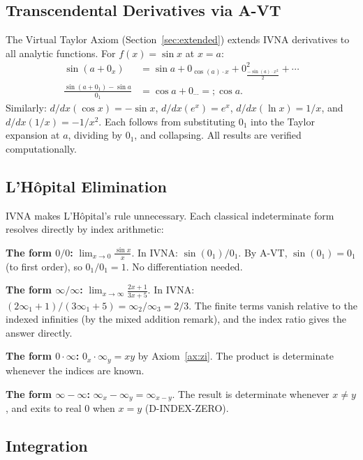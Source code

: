 \documentclass[12pt]{article}
\theoremstyle{definition}
\theoremstyle{remark}
\newcommand{\vz}[1]{0_{#1}}             %
\newcommand{\vi}[1]{\infty_{#1}}        %
\newcommand{\vzn}[2]{0^{#1}_{#2}}       %
\newcommand{\ceq}{\mathrel{=\!\!;}}     %
\begin{document}
\subsection{Transcendental Derivatives via A-VT}

The Virtual Taylor Axiom (Section~\ref{sec:extended}) extends IVNA
derivatives to all analytic functions. For $f(x) = \sin x$ at $x = a$:
\begin{align*}
\sin(a + \vz{x}) &= \sin a + \vz{\cos(a) \cdot x}
  + \vzn{2}{\tfrac{-\sin(a) \cdot x^2}{2}} + \cdots \\
\frac{\sin(a + \vz{1}) - \sin a}{\vz{1}} &= \cos a + \vz{\cdots}
  \ceq \cos a.
\end{align*}
Similarly: $d/dx(\cos x) = -\sin x$, $d/dx(e^x) = e^x$,
$d/dx(\ln x) = 1/x$, and $d/dx(1/x) = -1/x^2$. Each follows from
substituting $\vz{1}$ into the Taylor expansion at $a$, dividing by
$\vz{1}$, and collapsing. All results are verified computationally.

\subsection{L'H\^opital Elimination}

IVNA makes L'H\^opital's rule unnecessary. Each classical
indeterminate form resolves directly by index arithmetic:

\medskip
\noindent\textbf{The form $0/0$:}
$\displaystyle\lim_{x \to 0} \frac{\sin x}{x}$.
In IVNA: $\sin(\vz{1})/\vz{1}$. By A-VT, $\sin(\vz{1}) = \vz{1}$
(to first order), so $\vz{1}/\vz{1} = 1$. No differentiation needed.

\medskip
\noindent\textbf{The form $\infty/\infty$:}
$\displaystyle\lim_{x \to \infty} \frac{2x+1}{3x+5}$.
In IVNA: $(2\vi{1} + 1)/(3\vi{1} + 5) = \vi{2}/\vi{3} = 2/3$.
The finite terms vanish relative to the indexed infinities (by the
mixed addition remark), and the index ratio gives the answer directly.

\medskip
\noindent\textbf{The form $0 \cdot \infty$:}
$\vz{x} \cdot \vi{y} = xy$ by Axiom~\ref{ax:zi}. The product is
determinate whenever the indices are known.

\medskip
\noindent\textbf{The form $\infty - \infty$:}
$\vi{x} - \vi{y} = \vi{x-y}$. The result is determinate whenever
$x \neq y$, and exits to real $0$ when $x = y$ (D-INDEX-ZERO).

\subsection{Integration}
\end{document}
